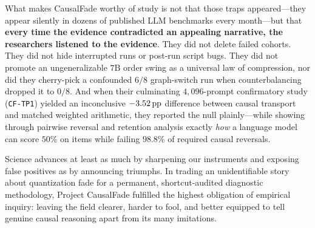 What makes CausalFade worthy of study is not that those traps appeared---they appear silently in dozens of published LLM benchmarks every month---but that \textbf{every time the evidence contradicted an appealing narrative, the researchers listened to the evidence}. They did not delete failed cohorts. They did not hide interrupted runs or post-run script bugs. They did not promote an ungeneralizable $7\text{B}$ order swing as a universal law of compression, nor did they cherry-pick a confounded $6/8$ graph-switch run when counterbalancing dropped it to $0/8$. And when their culminating $4{,}096$-prompt confirmatory study (\texttt{CF-TP1}) yielded an inconclusive $-3.52\,\mathrm{pp}$ difference between causal transport and matched weighted arithmetic, they reported the null plainly---while showing through pairwise reversal and retention analysis exactly \emph{how} a language model can score $50\%$ on items while failing $98.8\%$ of required causal reversals.

Science advances at least as much by sharpening our instruments and exposing false positives as by announcing triumphs. In trading an unidentifiable story about quantization fade for a permanent, shortcut-audited diagnostic methodology, Project CausalFade fulfilled the highest obligation of empirical inquiry: leaving the field clearer, harder to fool, and better equipped to tell genuine causal reasoning apart from its many imitations.

